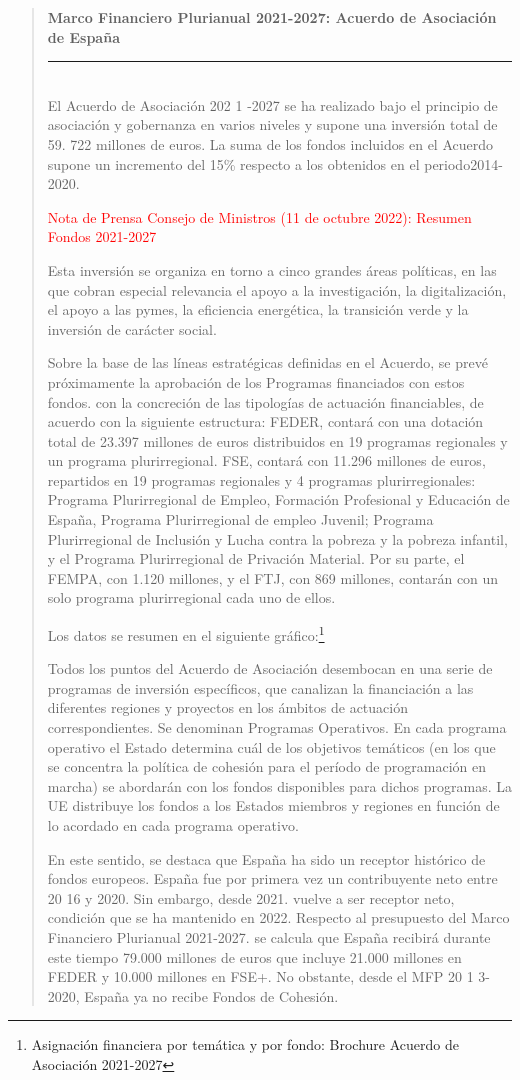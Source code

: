 \documentclass[10pt,a4paper]{article}
\newenvironment{specialblock}[1]{%
      \begin{quote} %
      \small %
      \noindent\textbf{#1}\\[-0.3em] %
      \rule{\linewidth}{0.4pt}\\[0.6em]}{
      \end{quote}}
\begin{document}
\begin{specialblock}{Marco Financiero Plurianual 2021-2027: Acuerdo de Asociación de España}
    El Acuerdo de Asociación 202 1 -2027 se ha realizado bajo el principio de asociación y gobernanza en varios niveles y supone una inversión total de 59. 722 millones de euros. La suma de los fondos incluidos en el Acuerdo supone un incremento del 15\% respecto a los obtenidos en el periodo2014-2020.

    \textcolor{red}{Nota de Prensa Consejo de Ministros (11 de octubre 2022): Resumen Fondos 2021-2027}

    Esta inversión se organiza en torno a cinco grandes áreas políticas, en las que cobran especial relevancia el apoyo a la investigación, la digitalización, el apoyo a las pymes, la eficiencia energética, la transición verde y la inversión de carácter social.

    Sobre la base de las líneas estratégicas definidas en el Acuerdo, se prevé próximamente la aprobación de los Programas financiados con estos fondos. con la concreción de las tipologías de actuación financiables, de acuerdo con la siguiente estructura: FEDER, contará con una dotación total de 23.397 millones de euros distribuidos en 19 programas regionales y un programa plurirregional. FSE, contará con 11.296 millones de euros, repartidos en 19 programas regionales y 4 programas plurirregionales: Programa Plurirregional de Empleo, Formación Profesional y Educación de España, Programa Plurirregional de empleo Juvenil; Programa Plurirregional de Inclusión y Lucha contra la pobreza y la pobreza infantil, y el Programa Plurirregional de Privación Material. Por su parte, el FEMPA, con 1.120 millones, y el FTJ, con 869 millones, contarán con un solo programa plurirregional cada uno de ellos. 
    
    Los datos se resumen en el siguiente gráfico:\footnote{%
        Asignación financiera por temática y por fondo: Brochure Acuerdo de Asociación 2021-2027
    }
    
    Todos los puntos del Acuerdo de Asociación desembocan en una serie de programas de inversión específicos, que canalizan la financiación a las diferentes regiones y proyectos en los ámbitos de actuación correspondientes. Se denominan Programas Operativos. En cada programa operativo el Estado determina cuál de los objetivos temáticos (en los que se concentra la política de cohesión para el período de programación en marcha) se abordarán con los fondos disponibles para dichos programas. La UE distribuye los fondos a los Estados miembros y regiones en función de lo acordado en cada programa operativo.

    En este sentido, se destaca que España ha sido un receptor histórico de fondos europeos. España fue por primera vez un contribuyente neto entre 20 16 y 2020. Sin embargo, desde 2021. vuelve a ser receptor neto, condición que se ha mantenido en 2022. Respecto al presupuesto del Marco Financiero Plurianual 2021-2027. se calcula que España recibirá durante este tiempo 79.000 millones de euros que incluye 21.000 millones en FEDER y 10.000 millones en FSE+. No obstante, desde el MFP 20 1 3-2020, España ya no recibe Fondos de Cohesión.
\end{specialblock}
\end{document}

